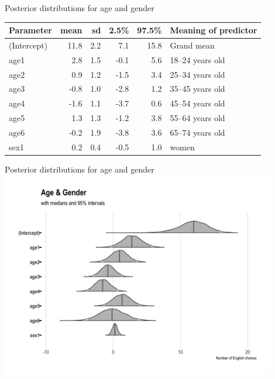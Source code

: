 \documentclass[10pt]{beamer}
\begin{document}
\begin{frame}{Posterior distributions for age and gender}
\begin{tabular}{lrrrrl}

  \toprule
Parameter & mean & sd & 2.5\% & 97.5\% & Meaning of predictor \\
  \midrule
(Intercept) & 11.8 & 2.2 & 7.1 & 15.8 & Grand mean \\
  age1 & 2.8 & 1.5 & -0.1 & 5.6 & 18--24 years old \\
  age2 & 0.9 & 1.2 & -1.5 & 3.4 & 25--34 years old \\
  age3 & -0.8 & 1.0 & -2.8 & 1.2 &  35--45 years old \\
  age4 & -1.6 & 1.1 & -3.7 & 0.6 &45--54 years old  \\
  age5 & 1.3 & 1.3 & -1.2 & 3.8 & 55--64 years old  \\
  age6 & -0.2 & 1.9 & -3.8 & 3.6 & 65--74 years old\\
  sex1 & 0.2 & 0.4 & -0.5 & 1.0 & women \\
  \bottomrule
  \end{tabular}
  \end{frame}

\begin{frame}{Posterior distributions for age and gender}
\includegraphics[width=0.9\textwidth]{figures/engAgeGender.png}
\end{frame}
\end{document}
